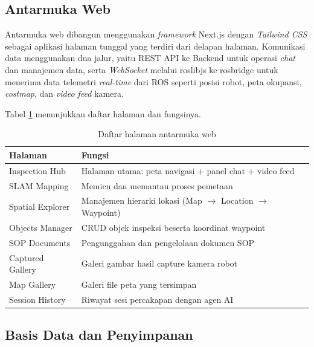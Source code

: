 \subsection{Antarmuka Web}

Antarmuka web dibangun menggunakan \textit{framework} Next.js dengan \textit{Tailwind CSS} sebagai aplikasi halaman tunggal yang terdiri dari delapan halaman. Komunikasi data menggunakan dua jalur, yaitu REST API ke Backend untuk operasi \textit{chat} dan manajemen data, serta \textit{WebSocket} melalui roslibjs ke rosbridge untuk menerima data telemetri \textit{real-time} dari ROS seperti posisi robot, peta okupansi, \textit{costmap}, dan \textit{video feed} kamera.

Tabel \ref{tab:web-pages} menunjukkan daftar halaman dan fungsinya.

\begin{table}[H]
\centering
\caption{Daftar halaman antarmuka web}
\label{tab:web-pages}
\begin{tabular}{|l|p{9cm}|}
\hline
\textbf{Halaman} & \textbf{Fungsi} \\ \hline
Inspection Hub & Halaman utama: peta navigasi + panel chat + video feed \\ \hline
SLAM Mapping & Memicu dan memantau proses pemetaan \\ \hline
Spatial Explorer & Manajemen hierarki lokasi (Map $\rightarrow$ Location $\rightarrow$ Waypoint) \\ \hline
Objects Manager & CRUD objek inspeksi beserta koordinat waypoint \\ \hline
SOP Documents & Pengunggahan dan pengelolaan dokumen SOP \\ \hline
Captured Gallery & Galeri gambar hasil capture kamera robot \\ \hline
Map Gallery & Galeri file peta yang tersimpan \\ \hline
Session History & Riwayat sesi percakapan dengan agen AI \\ \hline
\end{tabular}
\end{table}


\subsection{Basis Data dan Penyimpanan}

